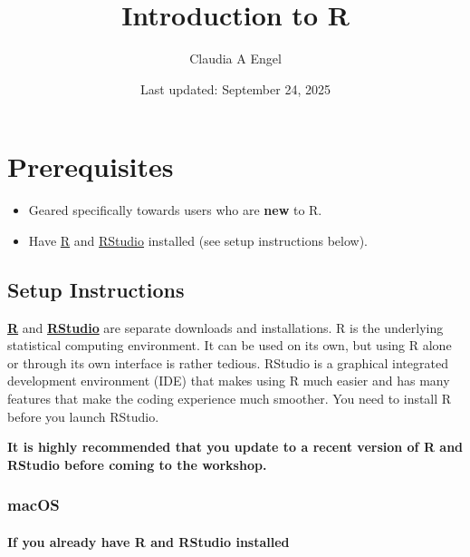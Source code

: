 \documentclass[
]{book}
\title{Introduction to R}
\author{Claudia A Engel}
\date{Last updated: September 24, 2025}
\providecommand{\tightlist}{%
  \setlength{\itemsep}{0pt}\setlength{\parskip}{0pt}}
\begin{document}
\maketitle

{
\setcounter{tocdepth}{1}
\tableofcontents
}
\chapter*{Prerequisites}\label{prerequisites}

\begin{itemize}
\tightlist
\item
  Geared specifically towards users who are \textbf{new} to R.\\
\item
  Have \href{https://cran.r-project.org/}{R} and \href{https://posit.co/download/rstudio-desktop/}{RStudio} installed (see setup instructions below).
\end{itemize}

\section*{Setup Instructions}\label{setup-instructions}

\href{https://cran.r-project.org/}{\textbf{R}} and \href{https://posit.co/download/rstudio-desktop/}{\textbf{RStudio}} are separate downloads and installations. R is the underlying statistical computing environment. It can be used on its own, but using R alone or through its own interface is rather tedious. RStudio is a graphical integrated development environment (IDE) that makes using R much easier and has many features that make the coding experience much smoother. You need to install R before you launch RStudio.

\textbf{It is highly recommended that you update to a recent version of R and RStudio before coming to the workshop.}

\subsection*{macOS}\label{macos}

\subsubsection*{If you already have R and RStudio installed}\label{if-you-already-have-r-and-rstudio-installed}
\end{document}

